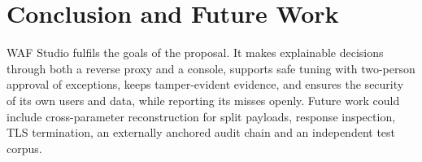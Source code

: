 \documentclass{FastFyp}
\begin{document}
\section{Conclusion and Future Work}
WAF Studio fulfils the goals of the proposal. It makes explainable decisions through both a reverse proxy and a console, supports safe tuning with two-person approval of exceptions, keeps tamper-evident evidence, and ensures the security of its own users and data, while reporting its misses openly. Future work could include cross-parameter reconstruction for split payloads, response inspection, TLS termination, an externally anchored audit chain and an independent test corpus.

{


}
\end{document}
